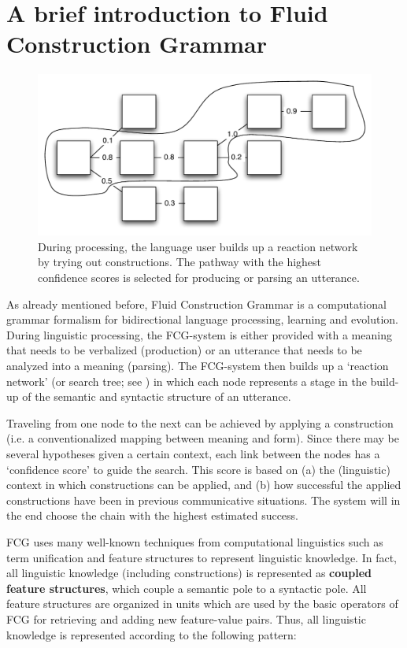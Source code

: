 \section{A brief introduction to Fluid Construction Grammar}

\begin{figure}
\centerline{\includegraphics[width=0.8\linewidth]{Chapter2/figs/reaction-network}}
  \caption[A reaction network]{During processing, the language user builds up a reaction network by trying out constructions. The pathway with the highest confidence scores is selected for producing or parsing an utterance.}
   \label{f:reaction}
\end{figure}

As already mentioned before, Fluid Construction Grammar is a computational grammar formalism for bidirectional language processing, learning and evolution. During linguistic processing, the FCG-system is either provided with a meaning that needs to be verbalized (production) or an utterance that needs to be analyzed into a meaning (parsing). The FCG-system then builds up a `reaction network' (or search tree; see ) in which each node represents a stage in the build-up of the semantic and syntactic structure of an utterance. 

Traveling from one node to the next can be achieved by applying a construction (i.e. a conventionalized mapping between meaning and form). Since there may be several hypotheses given a certain context, each link between the nodes has a `confidence score' to guide the search. This score is based on (a) the (linguistic) context in which constructions can be applied, and (b) how successful the applied constructions have been in previous communicative situations. The system will in the end choose the chain with the highest estimated success.

FCG uses many well-known techniques from computational linguistics such as term unification and feature structures to represent linguistic knowledge. In fact, all linguistic knowledge (including constructions) is represented as {\bfseries coupled feature structures}, which couple a semantic pole to a syntactic pole. All feature structures are organized in units which are used by the basic operators of FCG for retrieving and adding new feature-value pairs. Thus, all linguistic knowledge is represented according to the following pattern:

